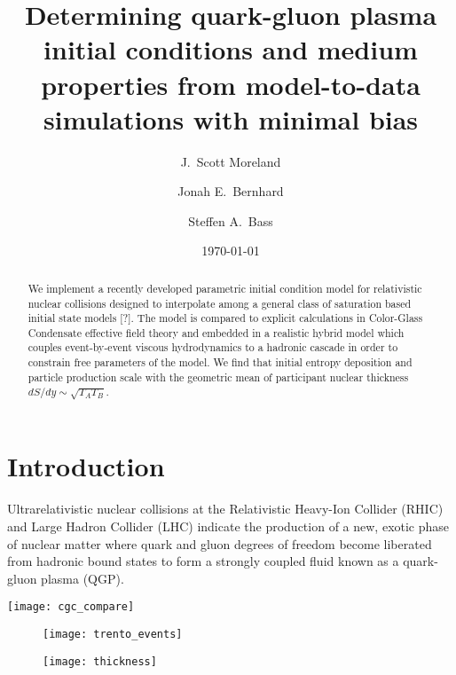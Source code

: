 \documentclass[aps,prc,reprint,amsmath]{revtex4-1}
\begin{document}
\title{Determining quark-gluon plasma initial conditions and medium \\ properties from model-to-data simulations with minimal bias}

\author{J.\ Scott Moreland}
\author{Jonah E.\ Bernhard}
\author{Steffen A.\ Bass}

\date{\today}


\begin{abstract}
  We implement a recently developed parametric initial condition model for relativistic nuclear collisions designed to interpolate among a general class of saturation based initial state models [?]. The model is compared to explicit calculations in Color-Glass Condensate effective field theory and embedded in a realistic hybrid model which couples event-by-event viscous hydrodynamics to a hadronic cascade in order to constrain free parameters of the model. We find that initial entropy deposition and particle production scale with the geometric mean of participant nuclear thickness $dS/dy \sim \sqrt{T_A T_B}$. 
\end{abstract}


\maketitle


\section{Introduction}

Ultrarelativistic nuclear collisions at the Relativistic Heavy-Ion Collider (RHIC) and Large Hadron Collider (LHC)
indicate the production of a new, exotic phase of nuclear matter where quark and gluon degrees of freedom become 
liberated from hadronic bound states to form a strongly coupled fluid known as a quark-gluon plasma (QGP). 

\begin{figure*}
    \texttt{[image: cgc\_compare]}
\end{figure*}

\begin{figure}
    \texttt{[image: trento\_events]}
\end{figure}

\begin{figure}[b]
    \texttt{[image: thickness]}
\end{figure}
\end{document}
